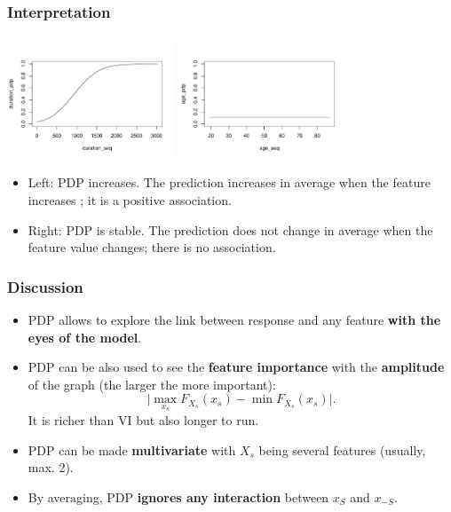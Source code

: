 \begin{frame}
\frametitle{Interpretation}
\begin{center}
\includegraphics[width=5cm]{../Graphs/PDP_Growing.pdf}
\includegraphics[width=5cm]{../Graphs/PDP_Stable.pdf}
\end{center}
\begin{itemize}
\item Left: PDP increases. The prediction increases in average when the feature increases ; it is a positive association.
\item Right: PDP is stable. The prediction does not change in average when the feature value changes; there is no association.
\end{itemize}
\end{frame}
\begin{frame}
\frametitle{Discussion}
\begin{itemize}
\item PDP allows to explore the link between response and any feature {\bf with the eyes of the model}.
\item PDP can be also used to see the {\bf feature importance} with the {\bf amplitude} of the graph (the larger the more important):
$$
\vert \max_{x_s} F_{X_s}(x_s) - \min F_{X_s}(x_s) \vert.
$$ 
It is richer than VI but also longer to run.
\item PDP can be made {\bf multivariate} with $X_s$ being several features (usually, max. 2).
\item By averaging, PDP {\bf ignores any interaction} between $x_S$ and $x_{-S}$.
\end{itemize}
\end{frame}
